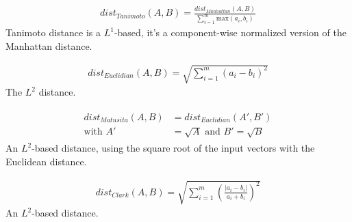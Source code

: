\begin{definition}
  \begin{gather*}
    dist_{Tanimoto}(A, B) = \frac{dist_{Manhattan}(A, B)}{\sum_{i=1}^{m} \mathrm{max}(a_i, b_i)}
  \end{gather*}
  Tanimoto distance is a $L^1$-based, it's a component-wise normalized version of the Manhattan distance.
\end{definition}

\begin{definition}
  \begin{gather*}
    dist_{Euclidian}(A, B) = \sqrt{\sum_{i=1}^{m}(a_i - b_i)^2}
  \end{gather*}
  The $L^2$ distance.
\end{definition}

\begin{definition}
  \begin{gather*}
    \begin{split}
      dist_{Matusita}(A, B) &= dist_{Euclidian}(A', B') \\
      \text{with }A' &= \sqrt{A}\text{ and }B' = \sqrt{B}
    \end{split}
  \end{gather*}
  An $L^2$-based distance, using the square root of the input vectors with the Euclidean distance.
\end{definition}

\begin{definition}
  \begin{gather*}
    dist_{Clark}(A, B) = \sqrt{\sum_{i=1}^{m}\left(\frac{|a_i - b_i|}{a_i + b_i}\right)^2}
  \end{gather*}
  An $L^2$-based distance.
\end{definition}

